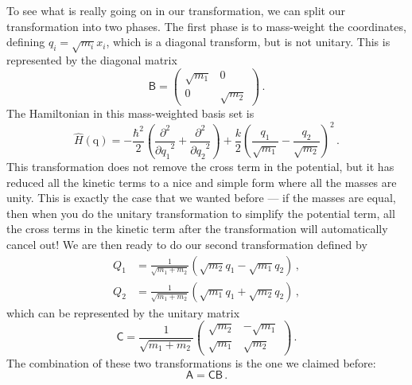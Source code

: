 \documentclass{article}
\theoremstyle{plain}\theoremheaderfont{\normalfont\itshape}\theorembodyfont{\rmfamily}\theoremseparator{.}\newtheorem*{rem}{Remark}\newtheorem*{ex}{Example}\newtheorem*{proof}{Proof}\newtheorem*{altp}{Alternative proof}
\theoremstyle{plain}\theoremheaderfont{\normalfont\bfseries}\theorembodyfont{\rmfamily}\theoremseparator{.}\newtheorem{thm}{Theorem}[section]\newtheorem{lem}[thm]{Lemma}\newtheorem{prop}[thm]{Proposition}\newtheorem*{cor}{Corollary}\newtheorem{defn}[thm]{Definition}\newtheorem{clm}[thm]{Claim}\newtheorem{clminproof}{Claim}
\theoremstyle{break}\theoremheaderfont{\normalfont\itshape}\theorembodyfont{\rmfamily}\theoremseparator{.\medskip}\newtheorem*{proofskip}{Proof}\newtheorem*{exs}{Examples}\newtheorem*{rems}{Remarks}
\theoremstyle{break}\theoremheaderfont{\normalfont\bfseries}\theorembodyfont{\rmfamily}\theoremseparator{.\medskip}\newtheorem{lemskip}[thm]{Lemma}\newtheorem{defnskip}[thm]{Definition}\newtheorem{propskip}[thm]{Proposition}\newtheorem{thmskip}[thm]{Theorem}
\numberwithin{equation}{section}
\newcommand{\pdv}[3][]{\frac{\partial^{#1} #2}{{\partial #3}^{#1}}}
\newcommand{\vb}[1]{\bm{\mathrm{#1}}}
\begin{document}
    To see what is really going on in our transformation, we can split our transformation into two phases. The first phase is to mass-weight the coordinates, defining \(q_i=\sqrt{m_i}x_i\), which is a diagonal transform, but is not unitary. This is represented by the diagonal matrix
    \begin{equation}
        \mathsf{B}=\begin{pmatrix}
            \sqrt{m_1} & 0 \\
            0 & \sqrt{m_2}
        \end{pmatrix}\,.
    \end{equation}
    The Hamiltonian in this mass-weighted basis set is
    \begin{equation}
        \hat{H}(\vb{q})=-\frac{\hbar^2}{2}\left(\pdv[2]{}{q_1}+\pdv[2]{}{q_2}\right)+\frac{k}{2}\left(\frac{q_1}{\sqrt{m_1}}-\frac{q_2}{\sqrt{m_2}}\right)^2\,.
    \end{equation}
    This transformation does not remove the cross term in the potential, but it has reduced all the kinetic terms to a nice and simple form where all the masses are unity. This is exactly the case that we wanted before --- if the masses are equal, then when you do the unitary transformation to simplify the potential term, all the cross terms in the kinetic term after the transformation will automatically cancel out! We are then ready to do our second transformation defined by
    \begin{align}
        Q_1&=\frac{1}{\sqrt{m_1+m_2}}(\sqrt{m_2}q_1-\sqrt{m_1}q_2)\,,\\
        Q_2&=\frac{1}{\sqrt{m_1+m_2}}(\sqrt{m_1}q_1+\sqrt{m_2}q_2)\,,
    \end{align}
    which can be represented by the unitary matrix
    \begin{equation}
        \mathsf{C}=\frac{1}{\sqrt{m_1+m_2}}\begin{pmatrix}
            \sqrt{m_2} & -\sqrt{m_1}\\
            \sqrt{m_1} & \sqrt{m_2}
        \end{pmatrix}\,.
    \end{equation}
    The combination of these two transformations is the one we claimed before:
    \begin{equation}
        \mathsf{A}=\mathsf{CB}\,.
    \end{equation}
\end{document}
